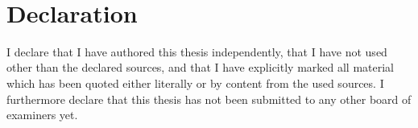 \documentclass[oneside, 12pt]{scrreprt}
\begin{document}
 

\thispagestyle{empty}
\setcounter{page}{0}
\tableofcontents
\clearpage

\setcounter{page}{1} \normalsize









%
%
%





${ } $




%
%
%
%
\printbibliography
\chapter*{Declaration}
I declare that I have authored this thesis independently, that I have not used other than the declared sources, and that I have explicitly marked all material which has been quoted either literally or by content from the used sources. I furthermore declare that this thesis has not been submitted to any other board of examiners yet.
\end{document}
